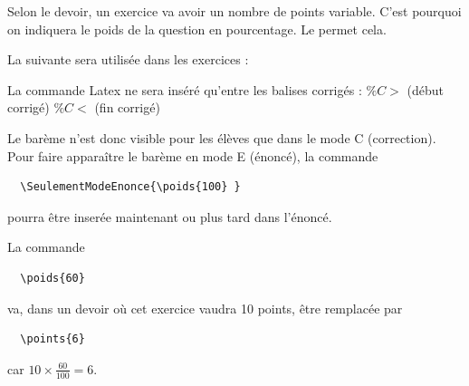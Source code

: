 \label{convention bareme question}
\begin{dsxl}
 Selon le devoir, un exercice va avoir un nombre de points variable. C'est pourquoi on indiquera le poids de la question en pourcentage. 
Le  permet cela. 
\end{dsxl}

La  suivante sera utilisée dans les exercices : 
\begin{dsxl}
 La commande Latex   ne sera inséré qu'entre les balises corrigés :  $\%C>$ (début corrigé)  $\%C<$ (fin corrigé)
\end{dsxl}

Le barème n'est donc visible pour les élèves que dans le mode C (correction). Pour faire apparaître le barème en mode E (énoncé), la commande 
\begin{verbatim}
  \SeulementModeEnonce{\poids{100} }
\end{verbatim}
pourra être inserée maintenant ou plus tard dans l'énoncé.

\begin{dsxl}
 La commande 
 \begin{verbatim}
  \poids{60}
 \end{verbatim}
va, dans un devoir où cet exercice vaudra 10 points, être remplacée par 
 \begin{verbatim}
  \points{6}
 \end{verbatim}
 car $10\times \frac{60}{100} = 6$. 
\end{dsxl}

